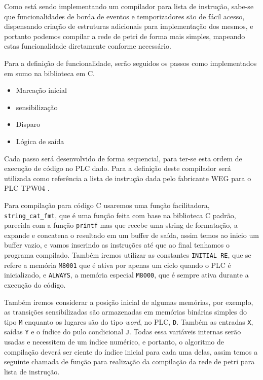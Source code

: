 Como está sendo implementando um compilador para lista de instrução, sabe-se que funcionalidades de borda de eventos e temporizadores são de fácil acesso, dispensando criação de estruturas adicionais para implementação dos mesmos, e portanto podemos compilar a rede de petri de forma mais simples, mapeando estas funcionalidade diretamente conforme necessário. 

Para a definição de funcionalidade, serão seguidos os passos como implementados em sumo na biblioteca em C.

\begin{itemize}
	\item Marcação inicial
	\item sensibilização
	\item Disparo
	\item Lógica de saída
\end{itemize}

Cada passo será desenvolvido de forma sequencial, para ter-se esta ordem de execução de código no PLC dado. Para a definição deste compilador será utilizada como referência a lista de instrução dada pelo fabricante WEG para o PLC TPW04 \cite{wegtpw04}.

Para compilação para código C usaremos uma função facilitadora, \lstinline{string_cat_fmt}, que é uma função feita com base na biblioteca C padrão, parecida com a função \lstinline{printf} mas que recebe uma string de formatação, a expande e concatena o resultado em um buffer de saída, assim temos ao inicio um buffer vazio, e vamos inserindo as instruções até que ao final tenhamos o programa compilado. Também iremos utilizar as constantes \lstinline{INITIAL_RE}, que se refere a memória \lstinline{M8001} que é ativa por apenas um ciclo quando o PLC é inicializado, e \lstinline{ALWAYS}, a memória especial \lstinline{M8000}, que é sempre ativa durante a execução do código. 

Também iremos considerar a posição inicial de algumas memórias, por exemplo, as transições sensibilizadas são armazenadas em memórias binárias simples do tipo \lstinline{M} enquanto os lugares são do tipo \textit{word}, no PLC, \lstinline{D}. Também as entradas \lstinline{X}, saídas \lstinline{Y} e o índice do pulo condicional \lstinline{J}. Todas essa variáveis internas serão usadas e necessitem de um índice numérico, e portanto, o algoritmo de compilação deverá ser ciente do índice inicial para cada uma delas, assim temos a seguinte chamada de função para realização da compilação da rede de petri para lista de instrução.

